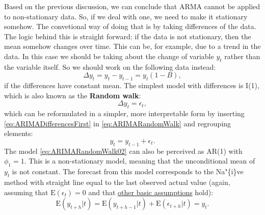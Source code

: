 \documentclass[
]{book}
\theoremstyle{definition}
\theoremstyle{definition}
\theoremstyle{definition}
\theoremstyle{definition}
\theoremstyle{remark}
\begin{document}
Based on the previous discussion, we can conclude that ARMA cannot be applied to non-stationary data. So, if we deal with one, we need to make it stationary somehow. The convetional way of doing that is by taking differences of the data. The logic behind this is straight forward: if the data is not stationary, then the mean somehow changes over time. This can be, for example, due to a trend in the data. In this case we should be taking about the change of variable \(y_t\) rather than the variable itself. So we should work on the following data instead:
\begin{equation}
  \Delta y_t = y_t - y_{t-1} = y_t (1 - B),
  \label{eq:ARIMADifferencesFirst}
\end{equation}
if the differences have constant mean. The simplest model with differences is I(1), which is also known as the \textbf{Random walk}:
\begin{equation}
  \Delta y_t = \epsilon_t,
  \label{eq:ARIMARandomWalk}
\end{equation}
which can be reformulated in a simpler, more interpretable form by inserting \eqref{eq:ARIMADifferencesFirst} in \eqref{eq:ARIMARandomWalk} and regrouping elements:
\begin{equation}
  y_t = y_{t-1} + \epsilon_t.
  \label{eq:ARIMARandomWalk02}
\end{equation}
The model \eqref{eq:ARIMARandomWalk02} can also be perceived as AR(1) with \(\phi_1=1\). This is a non-stationary model, meaning that the unconditional mean of \(y_t\) is not constant. The forecast from this model corresponds to the Na"\{i\}ve method with straight line equal to the last observed actual value (again, assuming that \(\mathrm{E}(\epsilon_{t})=0\) and that \protect\hyperlink{assumptions}{other basic assumptions} hold):
\begin{equation}
  \mathrm{E}(y_{t+h}|t) = \mathrm{E}(y_{t+h-1}|t) + \mathrm{E}(\epsilon_{t+h}|t) = y_{t} .
  \label{eq:ARIMARandomWalkForecast}
\end{equation}
\end{document}
